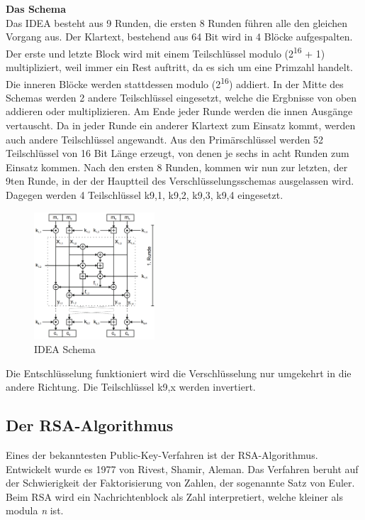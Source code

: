 \documentclass[11pt]{scrartcl}
\begin{document}
\noindent \textbf{Das Schema}\\
Das IDEA besteht aus 9 Runden, die ersten 8 Runden führen alle den gleichen Vorgang aus. Der Klartext, bestehend aus 64 Bit wird in 4 Blöcke aufgespalten. Der erste und letzte Block wird mit einem Teilschlüssel modulo (2\textsuperscript{16} + 1) multipliziert, weil immer ein Rest auftritt, da es sich um eine Primzahl handelt. Die inneren Blöcke werden stattdessen modulo (2\textsuperscript{16}) addiert. In der Mitte des Schemas werden 2 andere Teilschlüssel eingesetzt, welche die Ergbnisse von oben addieren oder multiplizieren. Am Ende jeder Runde werden die innen Ausgänge vertauscht. Da in jeder Runde ein anderer Klartext zum Einsatz kommt, werden auch andere Teilschlüssel angewandt. \grqq{} Aus den Primärschlüssel werden 52 Teilschlüssel von 16 Bit Länge erzeugt, von denen je sechs in acht Runden zum Einsatz kommen.\grqq{}\cite{6}
Nach den ersten 8 Runden, kommen wir nun zur letzten, der 9ten Runde, in der der Hauptteil des Verschlüsselungsschemas ausgelassen wird. Dagegen werden 4 Teilschlüssel k{\scriptsize 9,1}, k{\scriptsize 9,2}, k{\scriptsize 9,3}, k{\scriptsize 9,4} eingesetzt. \cite{3}\cite{6}
\begin{figure}[H]
\includegraphics[width=0.40\textwidth]{Bilder/IDEA/IDEA_Schema}
	\caption{IDEA Schema \cite{3}}
	\label{fig11}
\end{figure}
\noindent
Die Entschlüsselung funktioniert wird die Verschlüsselung nur umgekehrt in die andere Richtung. Die Teilschlüssel k{\scriptsize 9,x} werden invertiert. \cite{3}

\subsection{Der RSA-Algorithmus}
\label{sec:rsa-algorithmus}
Eines der bekanntesten Public-Key-Verfahren ist der RSA-Algorithmus. Entwickelt wurde es 1977 von Rivest, Shamir, Aleman. Das Verfahren beruht auf der Schwierigkeit der Faktorisierung von Zahlen, der sogenannte Satz von Euler. Beim RSA wird ein Nachrichtenblock als Zahl interpretiert, welche kleiner als modula \textit{n} ist. \cite{2}
\end{document}
